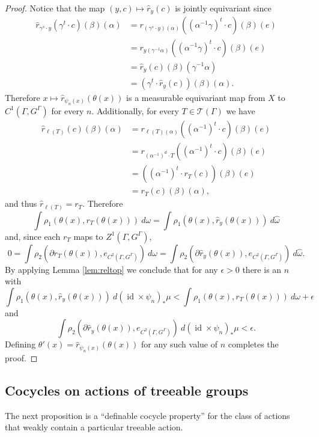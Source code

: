 \documentclass[12pt]{amsart}
\theoremstyle{definition}
\def\cal{\mathcal}
\DeclareMathOperator{\id}{id}
\begin{document}
\begin{proof}
	Notice that the map $(y, c) \mapsto \hat r_y(c)$ is jointly equivariant since
	\begin{align*}
		\hat r_{\gamma^s \cdot y}(\gamma^t \cdot c)(\beta)(\alpha) & = r_{(\gamma^s \cdot y)(\alpha)}((\alpha^{-1} \gamma)^t \cdot c)(\beta)(e)\\
		& = r_{y(\gamma^{-1}\alpha)}((\alpha^{-1} \gamma)^t \cdot c)(\beta)(e)\\
		& = \hat r_y(c)(\beta)(\gamma^{-1} \alpha)\\
		& = (\gamma^t \cdot \hat r_y(c))(\beta)(\alpha).
	\end{align*}
	Therefore $x \mapsto \hat r_{\psi_n(x)}(\theta(x))$ is a measurable equivariant map from $X$ to $C^1(\Gamma, G^\Gamma)$ for every $n$. Additionally, for every $T \in \cal T(\Gamma)$ we have
	\begin{align*}
		\hat r_{\ell(T)}(c)(\beta)(\alpha) & = r_{\ell(T)(\alpha)}((\alpha^{-1})^t \cdot c)(\beta)(e)\\
		& = r_{(\alpha^{-1})^d \cdot T}((\alpha^{-1})^t \cdot c)(\beta)(e)\\
		& = ((\alpha^{-1})^t \cdot r_T(c))(\beta)(e)\\
		& = r_T(c)(\beta)(\alpha),
	\end{align*}
	and thus $\hat r_{\ell(T)} = r_T$. Therefore
	\[\int \rho_1(\theta(x), r_T(\theta(x))) \ d \omega = \int \rho_1(\theta(x), \hat r_y(\theta(x))) \ d \widehat \omega\]
	and, since each $r_T$ maps to $Z^1(\Gamma, G^\Gamma)$,
	\[0 = \int \rho_2(\partial r_T(\theta(x)), e_{C^2(\Gamma, G^\Gamma)}) \ d \omega = \int \rho_2(\partial \hat r_y(\theta(x)), e_{C^2(\Gamma, G^\Gamma)}) \ d \widehat \omega.\]
	By applying Lemma \ref{lem:reltop} we conclude that for any $\epsilon > 0$ there is an $n$ with
	\[\int \rho_1(\theta(x), \hat r_y(\theta(x))) \ d (\id \times \psi_n)_* \mu < \int \rho_1(\theta(x), r_T(\theta(x))) \ d \omega + \epsilon\]
	and
	\[\int \rho_2(\partial \hat r_y(\theta(x)), e_{C^2(\Gamma, G^\Gamma)}) \ d (\id \times \psi_n)_* \mu < \epsilon.\]
	Defining $\theta'(x) = \hat r_{\psi_n(x)}(\theta(x))$ for any such value of $n$ completes the proof.
\end{proof}

\subsection{Cocycles on actions of treeable groups} \label{subs:cocytree}

The next proposition is a ``definable cocycle property'' for the class of actions that weakly contain a particular treeable action.
\end{document}
